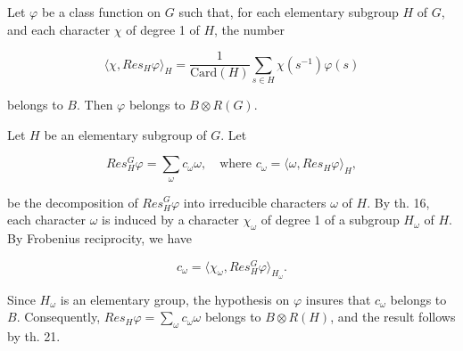 Let $\varphi$ be a class function on $G$ such that, for each elementary subgroup $H$ of $G$, and each character $\chi$ of degree 1 of $H$, the number

$$\langle \chi, Res_H \varphi \rangle_H = \frac{1}{\text{Card}(H)} \sum_{s \in H} \chi(s^{-1}) \varphi(s)$$

belongs to $B$. Then $\varphi$ belongs to $B \otimes R(G)$.

Let $H$ be an elementary subgroup of $G$. Let

$$Res_H^G \varphi = \sum_\omega c_\omega \omega, \quad \text{where } c_\omega = \langle \omega, Res_H \varphi \rangle_H,$$

be the decomposition of $Res_H^G \varphi$ into irreducible characters $\omega$ of $H$. By th. 16, each character $\omega$ is induced by a character $\chi_\omega$ of degree 1 of a subgroup $H_\omega$ of $H$. By Frobenius reciprocity, we have

$$c_\omega = \langle \chi_\omega, Res_H^G \varphi \rangle_H_\omega.$$

Since $H_\omega$ is an elementary group, the hypothesis on $\varphi$ insures that $c_\omega$ belongs to $B$. Consequently, $Res_H \varphi = \sum_\omega c_\omega \omega$ belongs to $B \otimes R(H)$, and the result follows by th. 21.
